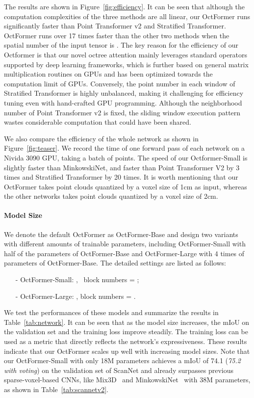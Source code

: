 \documentclass[acmtog,screen,authorversion]{acmart}
\begin{document}
The results are shown in Figure~\ref{fig:efficiency}.
It can be seen that although the computation complexities of the three methods are all linear, our OctFormer runs significantly faster than  Point Transformer v2 and Stratified Transformer.
OctFormer runs over 17 times faster than the other two methods when the spatial number of the input tensor is .
The key reason for the efficiency of our Octformer is that our novel octree attention mainly leverages standard operators supported by deep learning frameworks, which is further based on general matrix multiplication routines on GPUs and has been optimized towards the computation limit of GPUs. Conversely, the point number in each window of Stratified Transformer is highly unbalanced, making it challenging for efficiency tuning even with hand-crafted GPU programming.
Although the neighborhood number of Point Transformer v2 is fixed, the sliding window execution pattern wastes considerable computation that could have been shared.


We also compare the efficiency of the whole network as shown in Figure~\ref{fig:teaser}.
We record the time of one forward pass of each network on a Nivida 3090 GPU, taking a batch of  points.
The speed of our Octformer-Small is slightly faster than MinkowskiNet, and faster than Point Transformer V2 by 3 times and Stratified Transformer by  20 times.
It is worth mentioning that our OctFormer takes point clouds quantized by a voxel size of 1cm as input, whereas the other networks takes point clouds quantized by a voxel size of 2cm.






\paragraph{Model Size}
We denote the default OctFormer as OctFormer-Base and design two variants with different amounts of trainable parameters, including OctFormer-Small with half of the parameters of OctFormer-Base and OctFormer-Large with 4 times of parameters of OctFormer-Base.
The detailed settings are listed as follows:
\begin{itemize}[leftmargin=16pt,itemsep=2pt]
  \item[-] OctFormer-Small: , \, block numbers =  ;
  \item[-] OctFormer-Large: , block numbers = .
\end{itemize}
We test the performances of these models and summarize the results in Table~\ref{tab:network}.
It can be seen that as the model size increases, the mIoU on the validation set and the training loss improve steadily.
The training loss can be used as a metric that directly reflects the network's expressiveness.
These results indicate that our OctFormer scales up well with increasing model sizes.
Note that our OctFormer-Small with only 18M parameters achieves a mIoU of 74.1 (\emph{75.2 with voting}) on the validation set of ScanNet and already surpasses previous sparse-voxel-based CNNs, like Mix3D~\cite{Nekrasov2021} and MinkowskiNet~\cite{Choy2019} with 38M parameters, as shown in Table~\ref{tab:scannetv2}.
\end{document}
